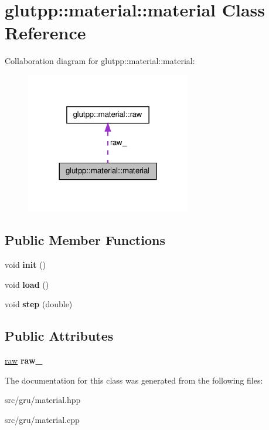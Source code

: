 \hypertarget{classglutpp_1_1material_1_1material}{\section{glutpp\-:\-:material\-:\-:material \-Class \-Reference}
\label{classglutpp_1_1material_1_1material}
}


\-Collaboration diagram for glutpp\-:\-:material\-:\-:material\-:\nopagebreak
\begin{figure}[H]
\begin{center}
\leavevmode
\includegraphics[width=204pt]{classglutpp_1_1material_1_1material__coll__graph}
\end{center}
\end{figure}
\subsection*{\-Public \-Member \-Functions}
\begin{DoxyCompactItemize}
\item 
\hypertarget{classglutpp_1_1material_1_1material_a5610c4dc9129ecc5fa6b28814fcf147e}{void {\bfseries init} ()}\label{classglutpp_1_1material_1_1material_a5610c4dc9129ecc5fa6b28814fcf147e}

\item 
\hypertarget{classglutpp_1_1material_1_1material_a70897de59b78a8fbd8ddf85e92385e98}{void {\bfseries load} ()}\label{classglutpp_1_1material_1_1material_a70897de59b78a8fbd8ddf85e92385e98}

\item 
\hypertarget{classglutpp_1_1material_1_1material_ae2b179fde85146dc1d8b0ca98e92cb7e}{void {\bfseries step} (double)}\label{classglutpp_1_1material_1_1material_ae2b179fde85146dc1d8b0ca98e92cb7e}

\end{DoxyCompactItemize}
\subsection*{\-Public \-Attributes}
\begin{DoxyCompactItemize}
\item 
\hypertarget{classglutpp_1_1material_1_1material_a345a3b15781a4e72450ce0fac04d7b88}{\hyperlink{structglutpp_1_1material_1_1raw}{raw} {\bfseries raw\-\_\-}}\label{classglutpp_1_1material_1_1material_a345a3b15781a4e72450ce0fac04d7b88}

\end{DoxyCompactItemize}


\-The documentation for this class was generated from the following files\-:\begin{DoxyCompactItemize}
\item 
src/gru/material.\-hpp\item 
src/gru/material.\-cpp\end{DoxyCompactItemize}
